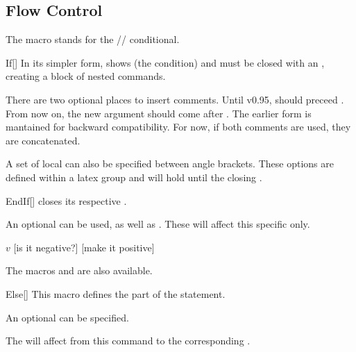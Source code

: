 \documentclass[a4paper, 11pt]{article}
\begin{document}
\subsection{Flow Control}
The macro  stands for the // conditional.

\begin{macro}{If}[]
    In its simpler form,  shows  (the condition) and must be closed with an , creating a block of nested commands.

    There are two optional places to insert comments. Until v0.95,  should preceed . From now on, the new  argument should come after . The earlier form is mantained for backward compatibility. For now, if both comments are used, they are concatenated.

    A set of local  can also be specified between angle brackets. These options are defined within a latex group and will hold until the closing .
\end{macro}

\begin{macro}{EndIf}[]
     closes its respective .

    An optional  can be used, as well as . These  will affect this specific  only.
\end{macro}

\begin{tcblisting}{}
    \begin{algorithmic}
        \State \Read $v$
        [is it negative?]
            [make it positive]
        \EndIf
    \end{algorithmic}
\end{tcblisting}

The macros  and  are also available.

\begin{macro}{Else}[]
    This macro defines the  part of the  statement.

    An optional  can be specified.

    The  will affect from this command to the corresponding .
\end{macro}
\end{document}
